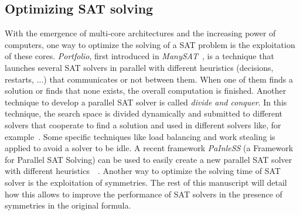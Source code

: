 \subsection{Optimizing SAT solving}
With the emergence of multi-core architectures and the increasing power of computers, one way to optimize the solving
of a SAT problem is the exploitation of these cores. %
\emph{Portfolio}, first introduced in \emph{ManySAT}~\cite{hamadi2008manysat}, is a technique that launches several SAT solvers in parallel with different heuristics (decisions, restarts, ...) that 
communicates or not between them. When one of them finds a solution or finds that none exists, the overall computation is finished.
Another technique to develop a parallel SAT solver is called \emph{divide and conquer}. In this technique,
the search space is divided  dynamically and submitted to different solvers that cooperate to find a solution and used in
different solvers like, for example~\cite{chu2008pminisat, lewis2007multithreaded}.
 Some specific techniques like load balancing and work stealing is applied to avoid a solver to be idle.
A recent framework \emph{PaInleSS} (a Framework for Parallel SAT Solving) can be used to easily create a new parallel 
SAT solver with different heuristics~\cite{le2017painless}~\cite{le2019modular}. 
Another way to optimize the solving time of SAT solver is the exploitation of symmetries. The rest of this manuscript will 
detail how this allows to improve the performance of SAT solvers in the presence of symmetries in the original formula.
%
